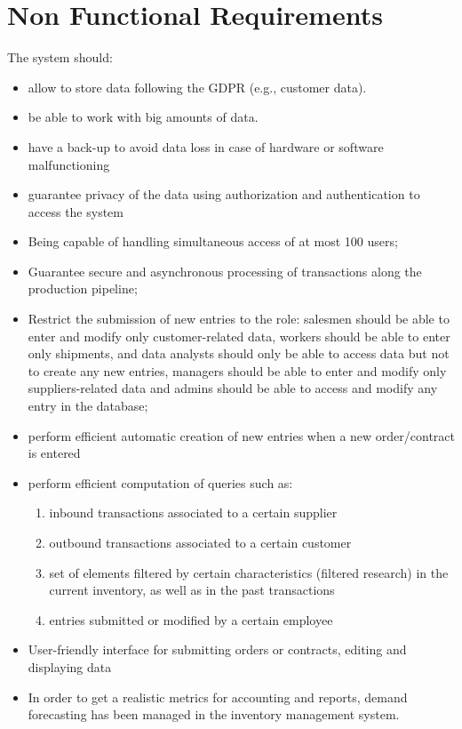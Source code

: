\section{Non Functional Requirements}
The system should:
\begin{itemize}
    \item allow to store data following the GDPR (e.g., customer data).
    \item be able to work with big amounts of data.
    \item have a back-up to avoid data loss in case of hardware or software malfunctioning
    \item guarantee privacy of the data using authorization and authentication to access the system
    \item Being capable of handling simultaneous access of at most 100 users;
    \item Guarantee secure and asynchronous processing of transactions along the production pipeline;
    \item Restrict the submission of new entries to the role: salesmen should be able to enter and modify only customer-related data, workers should be able to enter only shipments, and data analysts should only be able to access data but not to create any new entries, managers should be able to enter and modify only suppliers-related data and admins should be able to access and modify any entry in the database;
    \item perform efficient automatic creation of new entries when a new order/contract is entered 
    \item perform efficient computation of queries such as:
    \begin{enumerate}
	    \item inbound transactions associated to a certain supplier
	    \item outbound transactions associated to a certain customer
	    \item set of elements filtered by certain characteristics (filtered research) in the current inventory, as well as in the past transactions
   		\item entries submitted or modified by a certain employee
    \end{enumerate}
    \item User-friendly interface for submitting orders or contracts, editing and displaying data
    \item In order to get a realistic metrics for accounting and reports, demand forecasting has been managed in the inventory management system.
\end{itemize}

